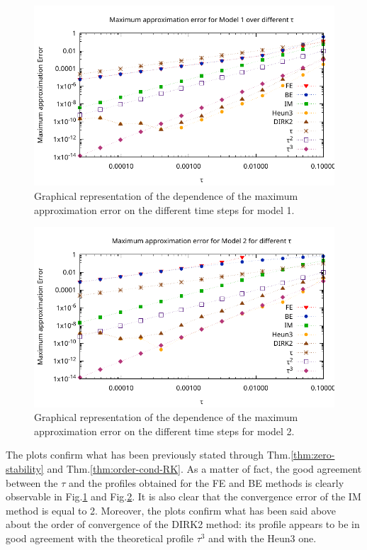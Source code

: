 \documentclass[11pt]{article}
\theoremstyle{theorem}
\theoremstyle{definition}
\begin{document}
\begin{figure}[H]
	\begin{center}
		\includegraphics[width=1.0\textwidth]{ME_M1}
	\end{center}
	\caption{Graphical representation of the dependence of the maximum approximation error on the different time steps for model 1.
		\label{fig:Err_M1}}
\end{figure}

\begin{figure}[H]
	\begin{center}
		\includegraphics[width=1.0\textwidth]{ME_M2}
	\end{center}
	\caption{Graphical representation of the dependence of the maximum approximation error on the different time steps for model 2.
		\label{fig:Err_M2}}
\end{figure}

The plots confirm what has been previously stated through Thm.\ref{thm:zero-stability} and Thm.\ref{thm:order-cond-RK}. As a matter of fact, the good agreement between the $\tau$ and the profiles obtained for the FE and BE methods is clearly observable in Fig.\ref{fig:Err_M1} and Fig.\ref{fig:Err_M2}. It is also clear that the convergence error of the IM method is equal to 2. Moreover, the plots confirm what has been said above about the order of convergence of the DIRK2 method: its profile appears to be in good agreement with the theoretical profile $\tau^3$ and with the Heun3 one.\\
\end{document}

